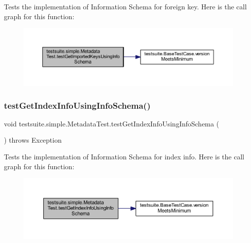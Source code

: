 Tests the implementation of Information Schema for foreign key. Here is the call graph for this function\+:
\nopagebreak
\begin{figure}[H]
\begin{center}
\leavevmode
\includegraphics[width=350pt]{classtestsuite_1_1simple_1_1_metadata_test_aaef304b87a16efa2655e6e93ca030117_cgraph}
\end{center}
\end{figure}
\mbox{\label{classtestsuite_1_1simple_1_1_metadata_test_ab4ebb88c45acf9e7ce6b2420037c0153}} 
\subsubsection{\texorpdfstring{test\+Get\+Index\+Info\+Using\+Info\+Schema()}{testGetIndexInfoUsingInfoSchema()}}
{\footnotesize\ttfamily void testsuite.\+simple.\+Metadata\+Test.\+test\+Get\+Index\+Info\+Using\+Info\+Schema (\begin{DoxyParamCaption}{ }\end{DoxyParamCaption}) throws Exception}

Tests the implementation of Information Schema for index info. Here is the call graph for this function\+:
\nopagebreak
\begin{figure}[H]
\begin{center}
\leavevmode
\includegraphics[width=350pt]{classtestsuite_1_1simple_1_1_metadata_test_ab4ebb88c45acf9e7ce6b2420037c0153_cgraph}
\end{center}
\end{figure}
\mbox{\label{classtestsuite_1_1simple_1_1_metadata_test_aec0bf7b994940c84160bf6100daf09bd}} 
